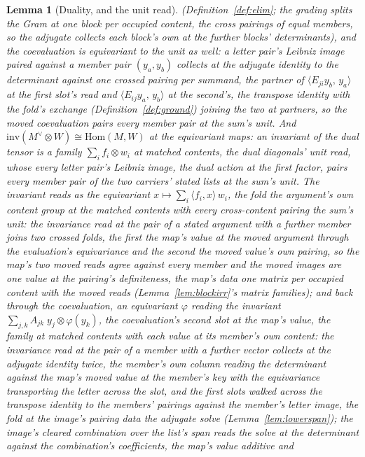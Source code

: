\documentclass[11pt]{article}
\newtheorem{lemma}{Lemma}
\theoremstyle{definition}
\begin{document}
\begin{lemma}[Duality, and the unit read]
(Definition~\ref{def:elim}; the grading splits the Gram at one block
per occupied content, the cross pairings of equal members, so the
adjugate collects each block's own at the further blocks'
determinants), and the coevaluation is equivariant to the unit as
well: a letter pair's Leibniz image paired against a member pair
$(y_a,y_b)$ collects at the adjugate identity to the determinant
against one crossed pairing per summand, the partner of
$\langle E_{ji}y_b,\,y_a\rangle$ at the first slot's read and
$\langle E_{ij}y_a,\,y_b\rangle$ at the second's, the transpose
identity with the fold's exchange (Definition~\ref{def:ground})
joining the two at partners, so the moved coevaluation pairs every
member pair at the sum's unit. And
$\mathrm{inv}(M^\vee\otimes W)\cong\mathrm{Hom}(M,W)$ at the
equivariant maps: an \emph{invariant} of the dual tensor is a family
$\sum_if_i\otimes w_i$ at matched contents, the dual diagonals' unit
read, whose every letter pair's Leibniz image, the dual action at
the first factor, pairs every member pair of the two carriers'
stated lists at the sum's unit. The invariant reads as the
equivariant $x\mapsto\sum_i\langle f_i,x\rangle\,w_i$, the fold
the argument's own content group at the matched contents with
every cross-content pairing the sum's unit: the
invariance read at the pair of a stated argument with a further
member joins two crossed folds, the first the map's value at the
moved argument through the evaluation's equivariance and the second
the moved value's own pairing, so the map's two moved reads agree
against every member and the moved images are one value at the
pairing's definiteness, the map's data one matrix per occupied
content with the moved reads (Lemma~\ref{lem:blockirr}'s matrix
families); and back through the coevaluation, an equivariant
$\varphi$ reading the invariant
$\sum_{j,k}A_{jk}\;y_j\otimes\varphi(y_k)$, the coevaluation's
second slot at the map's value, the family at matched contents
with each value at its member's own content: the invariance read
at the pair of a member with a further vector collects at the
adjugate identity twice, the member's own column reading the
determinant against the map's moved value at the member's key
with the equivariance transporting the letter across the slot,
and the first slots walked across the transpose identity to the
members' pairings against the member's letter image, the fold at
the image's pairing data the adjugate solve
(Lemma~\ref{lem:lowerspan}); the image's cleared combination over
the list's span reads the solve at the determinant against the
combination's coefficients, the map's value additive and

\end{lemma}
\end{document}
